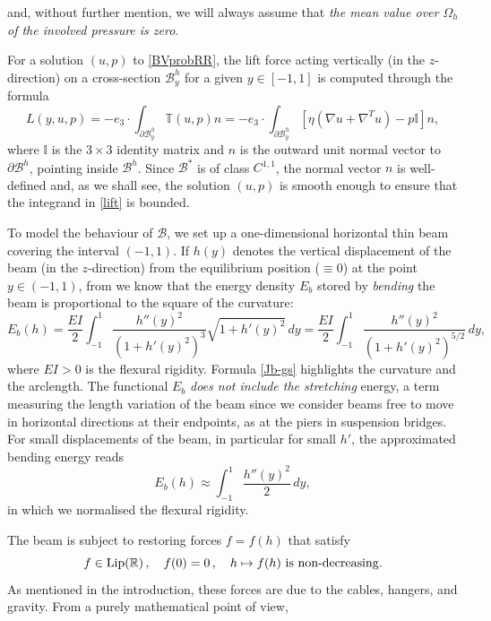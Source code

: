 \documentclass[11pt,a4paper]{amsart}
\def\neweq#1{\begin{equation}\label{#1}}
\def\endeq{\end{equation}}
\def\R{\mathbb{R}}
\theoremstyle{remark}
\theoremstyle{definition}
\numberwithin{equation}{section}
\numberwithin{proposition}{section}
\begin{document}
and, without further mention, we will always assume that {\it the mean value over $\Omega_h$ of the involved pressure is zero}.\par	
	For a solution $(u,p)$ to \eqref{BVprobRR}, the lift force acting vertically (in the $z$-direction) on a cross-section $\mathcal{B}_y^h$ for a given
	$y\in[-1,1]$ is computed through the formula
	\begin{equation}\label{lift}
		L(y, u,p)= -e_3\cdot\int_{\partial\mathcal{B}_y^h} \mathbb{T}(u, p)n= -e_3\cdot\int_{\partial\mathcal{B}_y^h}[\eta(\nabla u+\nabla^Tu)-p\mathbb{I}]n,
	\end{equation}
	where $\mathbb{I}$ is the $3\times3$ identity matrix and $n$ is the outward unit normal vector to $\partial\mathcal{B}^h$, pointing inside $\mathcal{B}^h$.
	Since $\mathcal{B}^*$ is of class $C^{1,1}$, the normal vector $n$ is well-defined and, as we shall see, the solution
	$(u,p)$ is smooth enough to ensure that  the integrand in \eqref{lift} is bounded.\par
	To model the behaviour of $\mathcal{B}$, we set up a one-dimensional horizontal thin beam covering the interval $(-1,1)$.
	If $h(y)$ denotes the vertical displacement of the beam (in the $z$-direction)
	from the equilibrium position ($\equiv0$) at the point $y\in(-1,1)$, from \cite[Section 1.1.1]{GGSbook} we know that the energy
	density $E_b$ stored by {\em bending} the beam is proportional to the square of the curvature:
	\begin{equation}\label{Jb-gs}
		E_b(h)=\frac{EI}{2}\int_{-1}^{1}\frac{h''(y)^{2}}{\left(1+h'(y)^{2}\right) ^{3}}\sqrt{1+h'(y)^{2}}\, dy=
		\frac{EI}{2}\int_{-1}^{1}\frac{h''(y)^{2}}{\left(1+h'(y)^{2}\right)^{5/2}}\, dy,
	\end{equation}
	where $EI>0$ is the flexural rigidity. Formula \eqref{Jb-gs} highlights the curvature and the arclength.
	The functional $E_b$ {\em does not include the stretching} energy, a term measuring the length variation of the beam
	since we consider beams free to move in horizontal directions at their endpoints, as at the piers in suspension bridges.
	For small displacements of the beam, in particular for small $h'$, the approximated bending energy reads
	\neweq{approxenergy}
	E_b(h)\approx\int_{-1}^{1}\frac{h''(y)^{2}}2 \, dy,
	\endeq
	in which we normalised the flexural rigidity.\par
	The beam is subject to restoring forces $f=f(h)$ that satisfy
	\neweq{assf}
	f\in{\rm Lip}(\R)\, ,\quad f(0)=0\, ,\quad h\mapsto f(h)\mbox{ is non-decreasing.}
	\endeq
	As mentioned in the introduction, these forces are due to the cables, hangers, and gravity. From a purely mathematical point of view,
\end{document}
